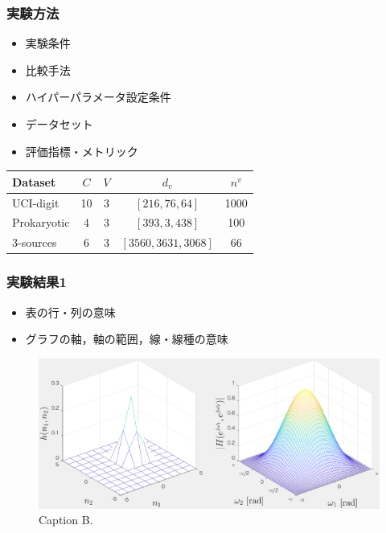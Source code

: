 \documentclass[dvipdfmx,cjk,t,10pt]{beamer}
\begin{document}
\begin{frame}
\frametitle{実験方法}
	\begin{itemize}
	\item 実験条件
	\item 比較手法
	\item ハイパーパラメータ設定条件	
	\item データセット
	\item 評価指標・メトリック
	\end{itemize}	
	
\begin{center}

{%
\begin{tabular}{l||c|c|c|c}
\hline
Dataset & $C$ & $V$ & $d_v$ & $n^v$ \\
\hline
\hline
UCI-digit & 10& 3 & $[216, 76, 64]$  & 1000 \\
\hline
Prokaryotic & 4& 3& $[393, 3, 438]$ & 100\\
\hline
3-sources & 6& 3& $[3560,3631,3068]$ & 66\\
\hline
\end{tabular}
}
\end{center}		
\end{frame}

\begin{frame}
\frametitle{実験結果1}
	\begin{itemize}
	\item 表の行・列の意味
	\item グラフの軸，軸の範囲，線・線種の意味
	\end{itemize}	
	
	\begin{figure}[htbp]
	\begin{center}	
	\includegraphics[width=0.85\hsize]{tmp.eps}
	\caption{Caption B.}
	\end{center}	
	\end{figure}				
\end{frame}
\end{document}
